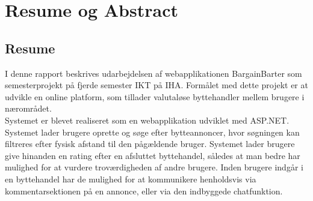 \chapter{Resume og Abstract}


\section{Resume}
I denne rapport beskrives udarbejdelsen af webapplikationen BargainBarter som semesterprojekt på fjerde semester IKT på IHA. Formålet med dette projekt er at udvikle en online platform, som tillader valutaløse byttehandler mellem brugere i nærområdet.
\\ Systemet er blevet realiseret som en webapplikation udviklet med ASP.NET. Systemet lader brugere oprette og søge efter bytteannoncer, hvor søgningen kan filtreres efter fysisk afstand til den pågældende bruger. Systemet lader brugere give hinanden en rating efter en afsluttet byttehandel, således at man bedre har mulighed for at vurdere troværdigheden af andre brugere. Inden brugere indgår i en byttehandel har de mulighed for at kommunikere henholdsvis via kommentarsektionen på en annonce, eller via den indbyggede chatfunktion.


